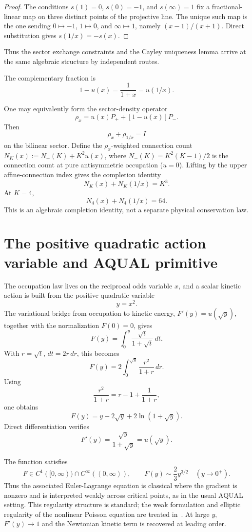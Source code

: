\documentclass[10pt]{article}
\begin{document}
\begin{proof}
The conditions $s(1)=0$, $s(0)=-1$, and $s(\infty)=1$ fix a fractional-linear
map on three distinct points of the projective line. The unique such map is the
one sending $0\mapsto -1$, $1\mapsto0$, and $\infty\mapsto1$, namely
$(x-1)/(x+1)$. Direct substitution gives $s(1/x)=-s(x)$.
\end{proof}

Thus the sector exchange constraints and the Cayley uniqueness lemma arrive at
the same algebraic structure by independent routes.

The complementary fraction is
\[
        1-u(x)=\frac1{1+x}=u(1/x).
\]

One may equivalently form the sector-density operator
\[
        \rho_x=u(x)P_+ + [1-u(x)]P_-.
\]
Then
\[
        \rho_x+\rho_{1/x}=I
\]
on the bilinear sector. Define the $\rho_x$-weighted connection count
$N_K(x):=N_-(K)+K^2u(x)$, where $N_-(K)=K^2(K-1)/2$ is the connection count
at pure antisymmetric occupation ($u=0$).  Lifting by the upper affine-connection index gives the
completion identity
\[
        N_K(x)+N_K(1/x)=K^3.
\]
At $K=4$,
\[
        N_4(x)+N_4(1/x)=64.
\]
This is an algebraic completion identity, not a separate physical conservation
law.

\section{The positive quadratic action variable and AQUAL primitive}
The occupation law lives on the reciprocal odds variable $x$, and a scalar
kinetic action is built from the positive quadratic variable
\[
        y=x^2.
\]
The variational bridge from occupation to kinetic energy,
$F'(y)=u(\sqrt y)$, together with the normalization $F(0)=0$, gives
\[
        F(y)=\int_0^y \frac{\sqrt t}{1+\sqrt t}\,dt.
\]
With $r=\sqrt t$, $dt=2r\,dr$, this becomes
\[
        F(y)=2\int_0^{\sqrt y}\frac{r^2}{1+r}\,dr.
\]
Using
\[
        \frac{r^2}{1+r}=r-1+\frac1{1+r},
\]
one obtains
\[
        \boxed{F(y)=y-2\sqrt y+2\ln(1+\sqrt y)}.
\]
Direct differentiation verifies
\[
        F'(y)=\frac{\sqrt y}{1+\sqrt y}=u(\sqrt y).
\]

The function satisfies
\[
        F\in C^1([0,\infty))\cap C^\infty((0,\infty)),
        \qquad
        F(y)\sim \frac23 y^{3/2}\quad (y\to0^+).
\]
Thus the associated Euler-Lagrange equation is classical where the gradient is
nonzero and is interpreted weakly across critical points, as in the usual AQUAL
setting.  This regularity structure is standard; the weak formulation and
elliptic regularity of the nonlinear Poisson equation are treated
in~\cite{BM1984}.  At large $y$, $F'(y)\to1$ and the Newtonian kinetic
term is recovered at leading order.
\end{document}
